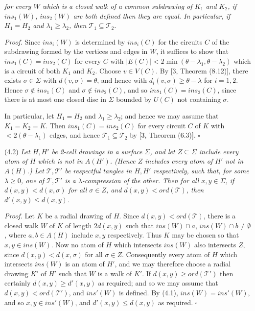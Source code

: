 \noindent \textit{for every $W$ which is a closed walk of a common subdrawing of $K_1$ and $K_2$, if $ins_1(W)$, $ins_2(W)$ are both defined then they are equal. In particular, if $H_1 = H_2$ and $\lambda_1 \ge \lambda_2$, then $\mathcal{T}_1 \subseteq \mathcal{T}_2$.}

\textit{Proof.} Since $ins_i(W)$ is determined by $ins_i(C)$ for the circuits $C$ of the subdrawing formed by the vertices and edges in $W$, it suffices to show that $ins_1(C) = ins_2(C)$ for every $C$ with $|E(C)| < 2\min(\theta - \lambda_1, \theta - \lambda_2)$ which is a circuit of both $K_1$ and $K_2$. Choose $v \in V(C)$. By [3, Theorem (8.12)], there exists $\sigma \in \Sigma$ with $d(v, \sigma) = \theta$, and hence with $d_i(v, \sigma) \ge \theta - \lambda$ for $i = 1, 2$. Hence $\sigma \notin ins_1(C)$ and $\sigma \notin ins_2(C)$, and so $ins_1(C) = ins_2(C)$, since there is at most one closed disc in $\Sigma$ bounded by $U(C)$ not containing $\sigma$.

In particular, let $H_1 = H_2$ and $\lambda_1 \ge \lambda_2$; and hence we may assume that $K_1 = K_2 = K$. Then $ins_1(C) = ins_2(C)$ for every circuit $C$ of $K$ with $< 2(\theta - \lambda_1)$ edges, and hence $\mathcal{T}_1 \subseteq \mathcal{T}_2$ by [3, Theorem (6.3)]. $\square$

\stmt
(4.2) \textit{Let $H, H'$ be 2-cell drawings in a surface $\Sigma$, and let $Z \subseteq \Sigma$ include every atom of $H$ which is not in $A(H')$. (Hence $Z$ includes every atom of $H'$ not in $A(H)$.) Let $\mathcal{T}, \mathcal{T}'$ be respectful tangles in $H, H'$ respectively, such that, for some $\lambda \ge 0$, one of $\mathcal{T}, \mathcal{T}'$ is a $\lambda$-compression of the other. Then for all $x, y \in \Sigma$, if $d(x, y) < d(x, \sigma)$ for all $\sigma \in Z$, and $d(x, y) < ord(\mathcal{T})$, then $d'(x, y) \le d(x, y)$.}

\textit{Proof.} Let $K$ be a radial drawing of $H$. Since $d(x, y) < ord(\mathcal{T})$, there is a closed walk $W$ of $K$ of length $2d(x, y)$ such that $ins(W) \cap a$, $ins(W) \cap b \ne \emptyset$, where $a, b \in A(H)$ include $x, y$ respectively. Thus $K$ may be chosen so that $x, y \in ins(W)$. Now no atom of $H$ which intersects $ins(W)$ also intersects $Z$, since $d(x, y) < d(x, \sigma)$ for all $\sigma \in Z$. Consequently every atom of $H$ which intersects $ins(W)$ is an atom of $H'$, and we may therefore choose a radial drawing $K'$ of $H'$ such that $W$ is a walk of $K'$. If $d(x, y) \ge ord(\mathcal{T}')$ then certainly $d(x, y) \ge d'(x, y)$ as required; and so we may assume that $d(x, y) < ord(\mathcal{T}')$, and $ins'(W)$ is defined. By (4.1), $ins(W) = ins'(W)$, and so $x, y \in ins'(W)$, and $d'(x, y) \le d(x, y)$ as required. $\square$

